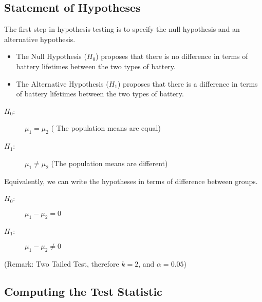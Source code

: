 \documentclass[a4paper,12pt]{article}
\begin{document}
\subsection*{Statement of Hypotheses}
\noindent The first step in hypothesis testing is to specify the null hypothesis and an alternative hypothesis.
\begin{itemize}
    \item The Null Hypothesis ($H_0$) proposes that there is no difference in terms of battery lifetimes between the two types of battery.
    \item The Alternative Hypothesis ($H_1$) proposes that there is a difference in terms of battery lifetimes between the two types of battery.
\end{itemize}
\begin{description}
\item[$H_0$:] $\mu_1 = \mu_2$ ( The population means are equal)
\item[$H_1$:] $\mu_1 \neq \mu_2$ (The population means are different)
\end{description}

\noindent Equivalently, we can write the hypotheses in terms of difference between groups.
\begin{description}
\item[$H_0$:] $\mu_1 - \mu_2 = 0 $ 
\item[$H_1$:] $\mu_1 - \mu_2\neq  0$ 
\end{description}



\noindent (Remark: Two Tailed Test, therefore $k = 2$, and $\alpha = 0.05$)
\newpage
\subsection*{Computing the Test Statistic}
\end{document}
